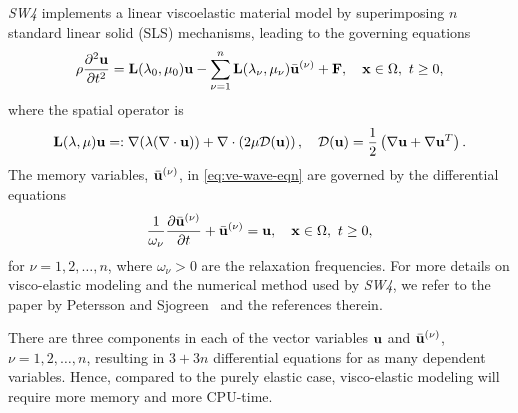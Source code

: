 \documentclass[11pt]{report}
\newcommand{\Fb}{{\bf F}}
\newcommand{\Lb}{{\bf L}}
\newcommand{\ub}{{\bf u}}
\newcommand{\xb}{{\bf x}}
\newcommand{\p}{\partial}
\begin{document}
{\emph{SW4} implements a linear viscoelastic material model by superimposing $n$ standard
linear solid (SLS) mechanisms, leading to the governing equations
\begin{equation}\label{eq:ve-wave-eqn}
	{\displaystyle \rho\dfrac{\p^2\ub}{\p t^2} = \Lb(\lambda_0,\mu_0)\ub - \sum_{\nu=1}^n
		\Lb(\lambda_{\nu},\mu_\nu)\bar{\ub}^{(\nu)} + \Fb,\quad \xb\in\Omega,\ t\geq 0},
\end{equation}
where the spatial operator is
\begin{equation}\label{eq:spatial-op}
	\Lb(\lambda,\mu)\ub =: \nabla(\lambda(\nabla\cdot\ub)) + \nabla\cdot \left(2\mu {\cal
			D}(\ub)\right),\quad {\cal D}(\ub) = \frac{1}{2}\left(\nabla \ub + \nabla\ub^T\right).
\end{equation}
The memory variables, $\bar{\ub}^{(\nu)}$, in \eqref{eq:ve-wave-eqn} are governed by the
differential equations
\begin{equation}\label{eq:ve-ode}
	\displaystyle \frac{1}{\omega_\nu}\frac{\p \bar{\ub}^{(\nu)}}{\p t} + \bar{\ub}^{(\nu)} = \ub,\quad
	\xb\in\Omega,\ t\geq 0,
\end{equation}
for $\nu=1,2,\ldots,n$, where $\omega_\nu>0$ are the relaxation frequencies. For more details on
visco-elastic modeling and the numerical method used by \emph{SW4}, we refer to the paper by
Petersson and Sjogreen~\cite{PetSjo-10b} and the references therein.

There are three components in each of the vector variables $\ub$ and $\bar{\ub}^{(\nu)}$,
$\nu=1,2,\ldots,n$, resulting in $3+3n$ differential equations for as many dependent
variables. Hence, compared to the purely elastic case, visco-elastic modeling will require more
memory and more CPU-time.

}
\end{document}
